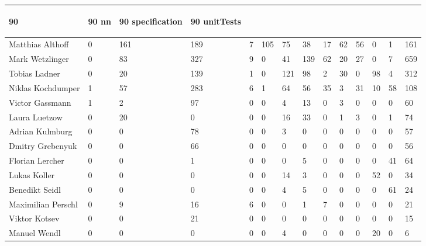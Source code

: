 \begin{table}[htb]
\begin{tabular}{l C{0.5cm} C{0.5cm} C{0.5cm} C{0.5cm} C{0.5cm} C{0.5cm} C{0.5cm} C{0.5cm} C{0.5cm} C{0.5cm} C{0.5cm} C{0.5cm} C{0.5cm} }
\begin{rotate}{90}
        \end{rotate} & \begin{rotate}{90}
                           \textbf{nn}
        \end{rotate} & \begin{rotate}{90}
                           \textbf{specification}
        \end{rotate} & \begin{rotate}{90}
                           \textbf{unitTests}
        \end{rotate} \\
        \midrule
        Matthias Althoff   & 0 & 161 & 189 & 7 & 105 & 75  & 38  & 17 & 62 & 56 & 0  & 1  & 161 \\
        Mark Wetzlinger    & 0 & 83  & 327 & 9 & 0   & 41  & 139 & 62 & 20 & 27 & 0  & 7  & 659 \\
        Tobias Ladner      & 0 & 20  & 139 & 1 & 0   & 121 & 98  & 2  & 30 & 0  & 98 & 4  & 312 \\
        Niklas Kochdumper  & 1 & 57  & 283 & 6 & 1   & 64  & 56  & 35 & 3  & 31 & 10 & 58 & 108 \\
        Victor Gassmann    & 1 & 2   & 97  & 0 & 0   & 4   & 13  & 0  & 3  & 0  & 0  & 0  & 60  \\
        Laura Luetzow      & 0 & 20  & 0   & 0 & 0   & 16  & 33  & 0  & 1  & 3  & 0  & 1  & 74  \\
        Adrian Kulmburg    & 0 & 0   & 78  & 0 & 0   & 3   & 0   & 0  & 0  & 0  & 0  & 0  & 57  \\
        Dmitry Grebenyuk   & 0 & 0   & 66  & 0 & 0   & 0   & 0   & 0  & 0  & 0  & 0  & 0  & 56  \\
        Florian Lercher    & 0 & 0   & 1   & 0 & 0   & 0   & 5   & 0  & 0  & 0  & 0  & 41 & 64  \\
        Lukas Koller       & 0 & 0   & 0   & 0 & 0   & 14  & 3   & 0  & 0  & 0  & 52 & 0  & 34  \\
        Benedikt Seidl     & 0 & 0   & 0   & 0 & 0   & 4   & 5   & 0  & 0  & 0  & 0  & 61 & 24  \\
        Maximilian Perschl & 0 & 9   & 16  & 6 & 0   & 0   & 1   & 7  & 0  & 0  & 0  & 0  & 21  \\
        Viktor Kotsev      & 0 & 0   & 21  & 0 & 0   & 0   & 0   & 0  & 0  & 0  & 0  & 0  & 15  \\
        Manuel Wendl       & 0 & 0   & 0   & 0 & 0   & 4   & 0   & 0  & 0  & 0  & 20 & 0  & 6   \\
        \bottomrule
    \end{tabular}
\end{table}

